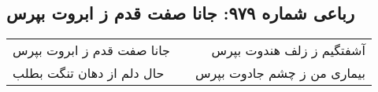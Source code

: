 \begin{center}
\section*{رباعی شماره ۹۷۹: جانا صفت قدم ز ابروت بپرس}
\label{sec:0979}
\begin{longtable}{l p{0.5cm} r}
جانا صفت قدم ز ابروت بپرس
&&
آشفتگیم ز زلف هندوت بپرس
\\
حال دلم از دهان تنگت بطلب
&&
بیماری من ز چشم جادوت بپرس
\\
\end{longtable}
\end{center}
